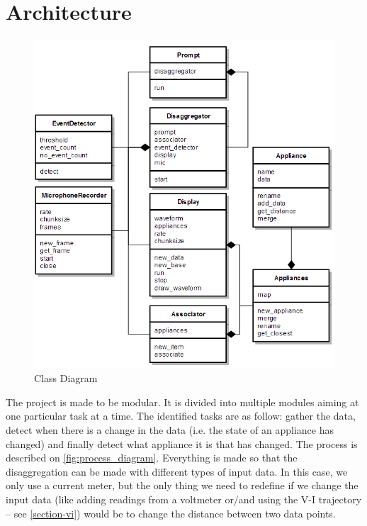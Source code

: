 \section{Architecture}
\begin{figure}
    \centering
    \includegraphics[width=\textwidth]{img/diagram.png}
    \caption{Class Diagram}
    \label{fig:class_diagram}
\end{figure}
The project is made to be modular. It is divided into multiple modules aiming at one particular task at a time. The identified tasks are as follow: gather the data, detect when there is a change in the data (i.e. the state of an appliance has changed) and finally detect what appliance it is that has changed. The process is described on \autoref{fig:process_diagram}. Everything is made so that the disaggregation can be made with different types of input data. In this case, we only use a current meter, but the only thing we need to redefine if we change the input data (like adding readings from a voltmeter or/and using the V-I trajectory -- see \autoref{section-vi}) would be to change the distance between two data points.


